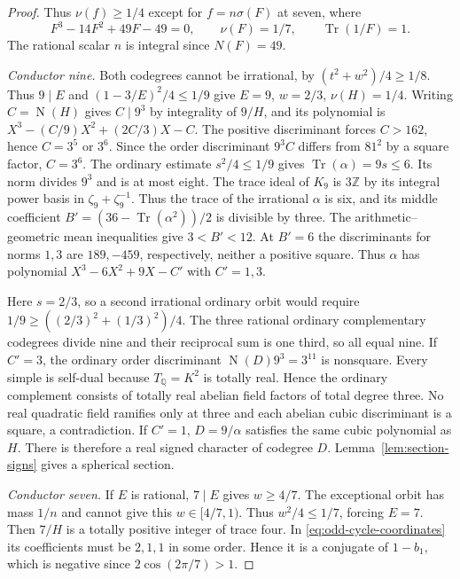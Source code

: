 \documentclass[11pt,reqno]{amsart}
\theoremstyle{remark}\newtheorem{remark}[theorem]{Remark}
\numberwithin{equation}{section}
\begin{document}
\begin{proof}
Thus $\nu(f)\ge1/4$ except for $f=n\sigma(F)$ at seven, where
\[
 F^3-14F^2+49F-49=0,\qquad
 \nu(F)=1/7,\qquad \operatorname{Tr}(1/F)=1 .
\]
The rational scalar $n$ is integral since $N(F)=49$.

\smallskip\textit{Conductor nine.} Both codegrees cannot be irrational, by
$(t^2+w^2)/4\ge1/8$. Thus $9\mid E$ and $(1-3/E)^2/4\le1/9$ give
$E=9$, $w=2/3$, $\nu(H)=1/4$. Writing $C=\operatorname{N}(H)$ gives
$C\mid9^3$ by integrality of $9/H$, and its polynomial is
$X^3-(C/9)X^2+(2C/3)X-C$. The positive discriminant forces $C>162$,
hence $C=3^5$ or $3^6$. Since the order discriminant $9^3 C$
differs from $81^2$ by a square factor, $C=3^6$.
The ordinary estimate $s^2/4\le1/9$ gives
$\operatorname{Tr}(\alpha)=9s\le6$. Its norm divides $9^3$ and is
at most eight. The trace ideal of $K_9$ is $3\mathbb Z$ by its integral power
basis in $\zeta_9+\zeta_9^{-1}$. Thus the trace of the irrational
$\alpha$ is six, and its middle coefficient $B'=(36-\operatorname{Tr}
(\alpha^2))/2$ is divisible by three. The arithmetic--geometric
mean inequalities give $3<B'<12$. At $B'=6$ the discriminants for
norms $1,3$ are $189,-459$, respectively, neither a positive square.
Thus $\alpha$ has polynomial $X^3-6X^2+9X-C'$ with $C'=1,3$.

Here $s=2/3$, so a second irrational ordinary orbit would require
$1/9\ge((2/3)^2+(1/3)^2)/4$. The three rational ordinary
complementary codegrees divide nine and their reciprocal sum is one
third, so all equal nine. If $C'=3$, the ordinary order discriminant
$\operatorname{N}(D)9^3=3^{11}$ is nonsquare. Every simple is self-dual
because $T_{\mathbb Q}=K^2$ is totally real. Hence the ordinary
complement consists of totally real abelian field factors of total
degree three. No real quadratic field ramifies only at three and
each abelian cubic discriminant is a square, a contradiction.
If $C'=1$, $D=9/\alpha$ satisfies the same cubic polynomial as $H$.
There is therefore a real signed character of codegree $D$.
Lemma~\ref{lem:section-signs} gives a spherical section.

\smallskip\textit{Conductor seven.} If $E$ is rational, $7\mid E$ gives $w\ge4/7$. The exceptional
orbit has mass $1/n$ and cannot give this $w\in[4/7,1)$. Thus
$w^2/4\le1/7$, forcing $E=7$. Then $7/H$ is a totally positive integer of trace four.
In \eqref{eq:odd-cycle-coordinates} its coefficients must be
$2,1,1$ in some order. Hence it is a conjugate of $1-b_1$,
which is negative since $2\cos(2\pi/7)>1$.


\end{proof}
\end{document}
